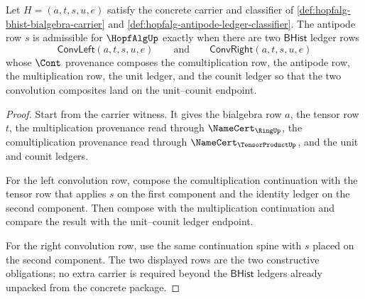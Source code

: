 \begin{theorem}
\label{thm:hopfalg-antipode-convolution-inverse-obligation}
Let $H=(a,t,s,u,e)$ satisfy the concrete carrier and classifier of \autoref{def:hopfalg-bhist-bialgebra-carrier} and \autoref{def:hopfalg-antipode-ledger-classifier}. The antipode row $s$ is admissible for $\HopfAlgUp$ exactly when there are two $\mathsf{BHist}$ ledger rows
$$
\mathsf{ConvLeft}(a,t,s,u,e)
\qquad\text{and}\qquad
\mathsf{ConvRight}(a,t,s,u,e)
$$
whose $\Cont$ provenance composes the comultiplication row, the antipode row, the multiplication row, the unit ledger, and the counit ledger so that the two convolution composites land on the unit--counit endpoint.
\end{theorem}
\begin{proof}
Start from the carrier witness. It gives the bialgebra row $a$, the tensor row $t$, the multiplication provenance read through $\NameCert_{\RingUp}$, the comultiplication provenance read through $\NameCert_{\TensorProductUp}$, and the unit and counit ledgers.

For the left convolution row, compose the comultiplication continuation with the tensor row that applies $s$ on the first component and the identity ledger on the second component. Then compose with the multiplication continuation and compare the result with the unit--counit ledger endpoint.

For the right convolution row, use the same continuation spine with $s$ placed on the second component. The two displayed rows are the two constructive obligations; no extra carrier is required beyond the $\mathsf{BHist}$ ledgers already unpacked from the concrete package.
\end{proof}

